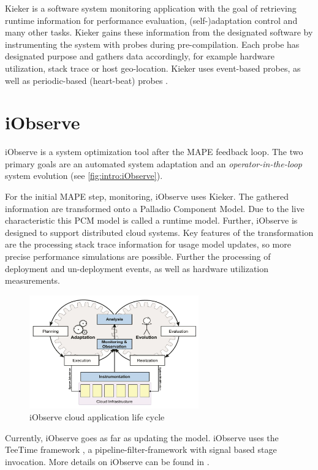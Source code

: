 Kieker is a software system monitoring application with the goal of retrieving runtime information for performance evaluation, (self-)adaptation control and many other tasks. Kieker gains these information from the designated software by instrumenting the system with probes during pre-compilation. Each probe has designated purpose and gathers data accordingly, for example hardware utilization, stack trace or host geo-location. Kieker uses event-based probes, as well as periodic-based (heart-beat) probes \cite{kieker.web}.


\section{iObserve}
\label{sec:Foundations:iobserve}

iObserve is a system optimization tool after the MAPE feedback loop. The two primary goals are an automated system adaptation and an \textit{operator-in-the-loop} system evolution (see \autoref{fig:intro:iObserve}).

For the initial MAPE step, monitoring, iObserve uses Kieker. The gathered information are transformed onto a Palladio Component Model. Due to the live characteristic this PCM model is called a runtime model. Further, iObserve is designed to support distributed cloud systems. Key features of the transformation are the processing stack trace information for usage model updates, so more precise performance simulations are possible. Further the processing of deployment and un-deployment events, as well as hardware utilization  measurements.

\begin{figure}[h]
	\centering
	\includegraphics[width=0.65\textwidth]{pictures/iObserve_principle}
	\caption{iObserve cloud application life cycle \cite{Heinrich.2016b}}
	\label{fig:intro:iObserve}
\end{figure}

Currently, iObserve goes as far as updating the model. iObserve uses the TeeTime framework \cite{teetime.16.05.2017}, a pipeline-filter-framework with signal based stage invocation. More details on iObserve can be found in \cite{Heinrich.2016b}\cite{Heinrich.2016}.

